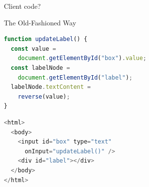 \documentclass[11.5pt, aspectratio=169]{beamer}
\begin{document}
\begin{frame}{Client code?}

\end{frame}

\begin{frame}[fragile]{The Old-Fashioned Way}


  \begin{minipage}{0.6\textwidth}
\begin{lstlisting}[language=JavaScript]
function updateLabel() {
  const value =
    document.getElementById("box").value;
  const labelNode =
    document.getElementById("label");
  labelNode.textContent =
    reverse(value);
}
\end{lstlisting}
\begin{lstlisting}[language=JavaScript]
<html>
  <body>
    <input id="box" type="text"
      onInput="updateLabel()" />
    <div id="label"></div>
  </body>
</html>
\end{lstlisting}%
\end{minipage}
\hfill
\begin{minipage}{0.35\textwidth}
\end{minipage}
\end{frame}
\end{document}
